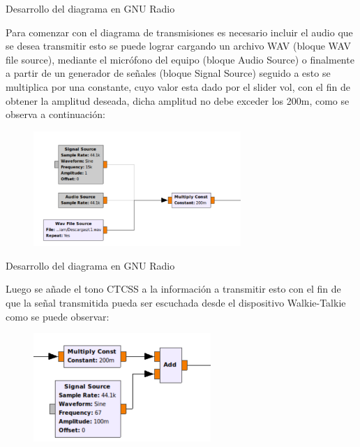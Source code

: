 \begin{frame}{Desarrollo del diagrama en GNU Radio}

Para comenzar con el diagrama de transmisiones es necesario incluir el audio que se desea transmitir esto se puede lograr cargando un archivo WAV (bloque WAV file source), mediante el micrófono del equipo (bloque Audio Source) o finalmente a partir de un generador de señales (bloque Signal Source) seguido a esto se multiplica por una constante, cuyo valor esta dado por el slider vol, con el fin de obtener la amplitud deseada, dicha amplitud no debe exceder los 200m, como se observa a continuación:

\begin{figure}[H]
\centering
\vspace{-3mm}
\includegraphics[width=0.7\textwidth]{parte3/lab14/pdf/Lab14_3.pdf}
\end{figure}


\end{frame}

\begin{frame}{Desarrollo del diagrama en GNU Radio}

Luego se añade el tono CTCSS a la información a transmitir esto con el fin de que la señal transmitida pueda ser escuchada desde el dispositivo Walkie-Talkie como se puede observar:

\begin{figure}[H]
\centering
\vspace{-3mm}
\includegraphics[width=0.6\textwidth]{parte3/lab14/pdf/Lab14_4.pdf}
\end{figure}

\end{frame}

